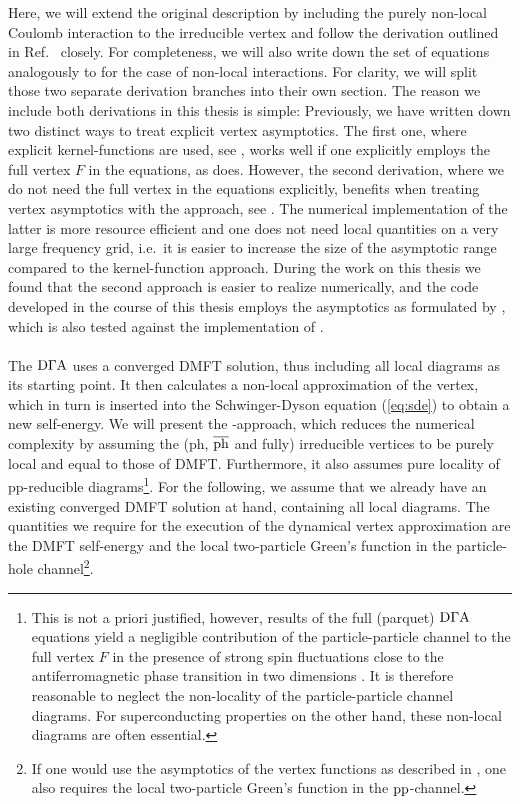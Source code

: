 \documentclass[../../main.tex]{subfiles}
\begin{document}
Here, we will extend the original description by including the purely non-local Coulomb interaction to the irreducible vertex and follow the derivation outlined in Ref.~\cite{Galler2017} closely. For completeness, we will also write down the set of equations analogously to \cite{Worm2023a} for the case of non-local interactions. For clarity, we will split those two separate derivation branches into their own section. The reason we include both derivations in this thesis is simple: Previously, we have written down two distinct ways to treat explicit vertex asymptotics. The first one, where explicit kernel-functions are used, see , works well if one explicitly employs the full vertex $F$ in the equations, as \cite{Galler2017} does. However, the second derivation, where we do not need the full vertex in the equations explicitly, benefits when treating vertex asymptotics with the  approach, see . The numerical implementation of the latter is more resource efficient and one does not need local quantities on a very large frequency grid, i.e.\ it is easier to increase the size of the asymptotic range compared to the kernel-function approach. During the work on this thesis we found that the second approach is easier to realize numerically, and the code developed in the course of this thesis employs the  asymptotics as formulated by \cite{Kitatani2019}, which is also tested against the implementation of \cite{Worm2023}.
\\\\
The $\text{D}\Gamma\text{A}$ uses a converged DMFT solution, thus including all local diagrams as its starting point. It then calculates a non-local approximation of the vertex, which in turn is inserted into the Schwinger-Dyson equation (\ref{eq:sde}) to obtain a new self-energy. We will present the -approach, which reduces the numerical complexity by assuming the (ph, $\overline{\text{ph}}$ and fully) irreducible vertices to be purely local and equal to those of DMFT. Furthermore, it also assumes pure locality of pp-reducible diagrams\footnote{This is not a priori justified, however, results of the full (parquet) $\text{D}\Gamma\text{A}$ equations yield a negligible contribution of the particle-particle channel to the full vertex $F$ in the presence of strong spin fluctuations close to the antiferromagnetic phase transition in two dimensions \cite{Held2008}. It is therefore reasonable to neglect the non-locality of the particle-particle channel diagrams. For superconducting properties on the other hand, these non-local diagrams are often essential.}. For the following, we assume that we already have an existing converged DMFT solution at hand, containing all local diagrams. The quantities we require for the execution of the dynamical vertex approximation are the DMFT self-energy and the local two-particle Green's function in the particle-hole channel\footnote{If one would use the asymptotics of the vertex functions as described in , one also requires the local two-particle Green's function in the $\text{pp}$-channel.}.
\end{document}
